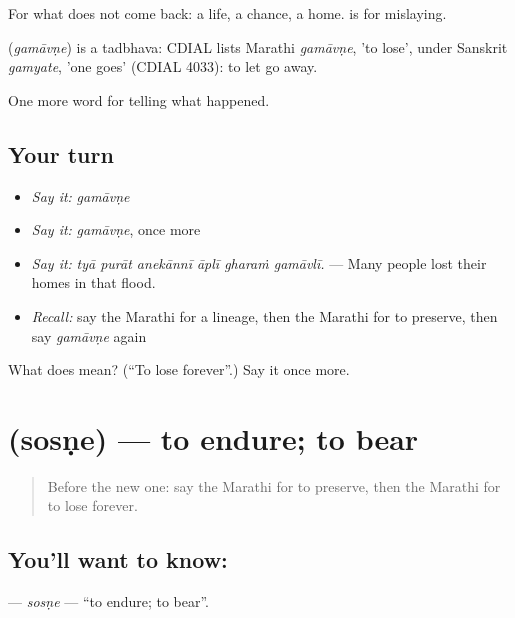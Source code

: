 For what does not come back: a life, a chance, a home.  is for mislaying.

\begin{cousinweb}
\textbf{} (\emph{gamāvṇe}) is a tadbhava: CDIAL lists Marathi \emph{gamāvṇe}, 'to lose', under Sanskrit \emph{gamyate}, 'one goes' (CDIAL 4033): to let go away.
\end{cousinweb}

\begin{grammarlens}[title={What you've built}]
One more word for telling what happened.
\end{grammarlens}

\subsection*{Your turn}
\begin{itemize}
\raggedright
  \item \emph{Say it:} \emph{gamāvṇe}
  \item \emph{Say it:} \emph{gamāvṇe}, once more
  \item \emph{Say it:} \emph{tyā purāt anekānnī āplī gharaṁ gamāvlī.} — Many people lost their homes in that flood.
  \item \emph{Recall:} say the Marathi for a lineage, then the Marathi for to preserve, then say \emph{gamāvṇe} again
\end{itemize}

\begin{tcolorbox}[breakable,colback=teal!4,colframe=teal!35!black,title={Before you move on}]
What does  mean? (\textquotedblleft{}To lose forever\textquotedblright{}.) Say it once more.
\end{tcolorbox}
\section[\texorpdfstring{\mr{सोसणे} (sosṇe)}{सोसणे (sosṇe)}]{ (sosṇe) — to endure; to bear}

\label{lesson:MR-C309-sosne}



\begin{quote}
Before the new one: say the Marathi for to preserve, then the Marathi for to lose forever.
\end{quote}

\subsection*{You'll want to know: }
\textbf{} — \emph{sosṇe} — \textquotedblleft{}to endure; to bear\textquotedblright{}.

